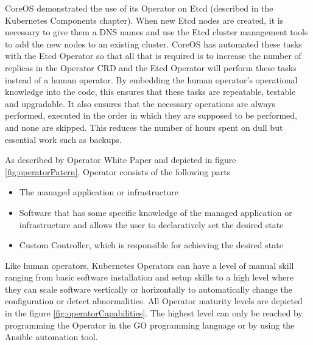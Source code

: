 
CoreOS demonstrated the use of its Operator on Etcd (described in the Kubernetes Components chapter). When new Etcd nodes are created, it is necessary to give them a DNS names and use the Etcd cluster management tools to add the new nodes to an existing cluster. CoreOS has automated these tasks with the Etcd Operator so that all that is required is to increase the number of replicas in the Operator CRD and the Etcd Operator will perform these tasks instead of a human operator. \cite{IArchiveCOSOperators}
By embedding the human operator's operational knowledge into the code, this ensures that these tasks are repeatable, testable and upgradable. It also ensures that the necessary operations are always performed, executed in the order in which they are supposed to be performed, and none are skipped. This reduces the number of hours spent on dull but essential work such as backups. \cite{OperatorWhitepaper}

As described by Operator White Paper \cite{OperatorWhitepaper} and depicted in figure \ref{fig:operatorPatern}, Operator consists of the following parts
\begin{itemize}
  \item The managed application or infrastructure
  \item Software that has some specific knowledge of the managed application or infrastructure and allows the user to declaratively set the desired state
  \item Custom Controller, which is responsible for achieving the desired state
\end{itemize}


Like human operators, Kubernetes Operators can have a level of manual skill ranging from basic software installation and setup skills to a high level where they can scale software vertically or horizontally to automatically change the configuration or detect abnormalities. All Operator maturity levels are depicted in the figure \ref{fig:operatorCapabilities}. The highest level can only be reached by programming the Operator in the GO programming language or by using the Ansible automation tool. \cite{OperatorsOframework}



